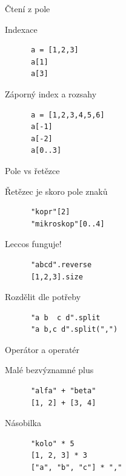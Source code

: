 \documentclass{beamer}
\begin{document}
\begin{frame}[fragile]{Čtení z pole}
  \begin{block}{Indexace}
    \begin{verbatim}
      a = [1,2,3]
      a[1]
      a[3]
    \end{verbatim}
  \end{block}
  \pause
  \begin{block}{Záporný index a rozsahy}
    \begin{verbatim}
      a = [1,2,3,4,5,6]
      a[-1]
      a[-2]
      a[0..3]
    \end{verbatim}
  \end{block}
\end{frame}

\begin{frame}[fragile]{Pole vs řetězce}
  \begin{block}{Řetězec je skoro pole znaků}
    \begin{verbatim}
      "kopr"[2]
      "mikroskop"[0..4]
    \end{verbatim}
  \end{block}
  \pause
  \begin{block}{Leccos funguje!}
    \begin{verbatim}
      "abcd".reverse
      [1,2,3].size
    \end{verbatim}
  \end{block}
  \begin{block}{Rozdělit dle potřeby}
    \begin{verbatim}
      "a b  c d".split
      "a b,c d".split(",")
    \end{verbatim}
  \end{block}
\end{frame}

\begin{frame}[fragile]{Operátor a operatér}
  \begin{block}{Malé bezvýznamné plus}
    \begin{verbatim}
      "alfa" + "beta"
      [1, 2] + [3, 4]
    \end{verbatim}
  \end{block}
  \pause
  \begin{block}{Násobilka}
    \begin{verbatim}
      "kolo" * 5
      [1, 2, 3] * 3
      ["a", "b", "c"] * ","
    \end{verbatim}
  \end{block}
\end{frame}
\end{document}
